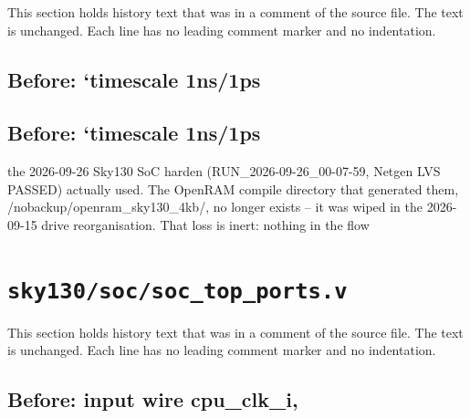 This section holds history text that was in a comment of the source file. The text is unchanged. Each line has no leading comment marker and no indentation.

\begin{record}

\subsection*{Before: `timescale 1ns/1ps}


\subsection*{Before: `timescale 1ns/1ps}

\begin{textblock}
the 2026-09-26 Sky130 SoC harden (RUN_2026-09-26_00-07-59, Netgen LVS
PASSED) actually used. The OpenRAM compile directory that generated them,
/nobackup/openram_sky130_4kb/, no longer exists -- it was wiped in the
2026-09-15 drive reorganisation. That loss is inert: nothing in the flow
\end{textblock}

\end{record}

\section{\texttt{sky130/soc/soc\_top\_ports.v}}\label{cr:pd:sky130-soc-soc-top-ports-v}

This section holds history text that was in a comment of the source file. The text is unchanged. Each line has no leading comment marker and no indentation.

\begin{record}

\subsection*{Before: input  wire        cpu\_clk\_i,}


\end{record}

